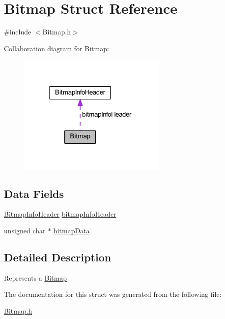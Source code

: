 \hypertarget{struct_bitmap}{}\section{Bitmap Struct Reference}
\label{struct_bitmap}


{\ttfamily \#include $<$Bitmap.\+h$>$}



Collaboration diagram for Bitmap\+:\nopagebreak
\begin{figure}[H]
\begin{center}
\leavevmode
\includegraphics[width=206pt]{struct_bitmap__coll__graph}
\end{center}
\end{figure}
\subsection*{Data Fields}
\begin{DoxyCompactItemize}
\item 
\hyperlink{struct_bitmap_info_header}{Bitmap\+Info\+Header} \hyperlink{group___bitmap_ga7157ca7f3ce4be47481c472fafd89313}{bitmap\+Info\+Header}
\item 
unsigned char $\ast$ \hyperlink{group___bitmap_ga586c4bcc42cf22a033e8f60f24f627f0}{bitmap\+Data}
\end{DoxyCompactItemize}


\subsection{Detailed Description}
Represents a \hyperlink{struct_bitmap}{Bitmap} 

The documentation for this struct was generated from the following file\+:\begin{DoxyCompactItemize}
\item 
\hyperlink{_bitmap_8h}{Bitmap.\+h}\end{DoxyCompactItemize}
